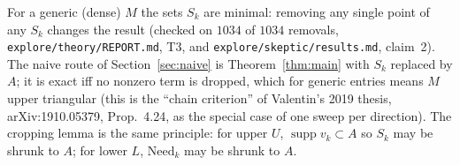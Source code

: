 \documentclass[11pt]{article}
\DeclareMathOperator{\supp}{supp}
\begin{document}
\begin{remark}
For a generic (dense) $M$ the sets $S_k$ are minimal: removing any single point of any $S_k$ changes the result
(checked on $1034$ of $1034$ removals, \texttt{explore/theory/REPORT.md}, T3, and \texttt{explore/skeptic/results.md},
claim~2). The naive route of Section~\ref{sec:naive} is Theorem~\ref{thm:main} with $S_k$ replaced by $A$; it is exact iff
no nonzero term is dropped, which for generic entries means $M$ upper triangular (this is the ``chain criterion'' of
Valentin's 2019 thesis, arXiv:1910.05379, Prop.~4.24, as the special case of one sweep per direction). The
cropping lemma is the same principle: for upper $U$, $\supp v_k\subset A$ so $S_k$ may be shrunk to $A$; for lower $L$,
$\mathrm{Need}_k$ may be shrunk to $A$.
\end{remark}
\end{document}
